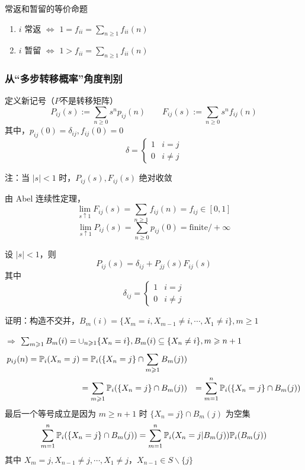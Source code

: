 \begin{proposition}
    常返和暂留的等价命题
    \begin{enumerate}
        \item $i$ 常返 $\Leftrightarrow$ $1=f_{ii}=\sum_{n\geq 1}f_{ii}(n)$
        \item $i$ 暂留 $\Leftrightarrow$ $1>f_{ii}=\sum_{n\geq 1}f_{ii}(n)$
    \end{enumerate}
\end{proposition}

\subsubsection{从“多步转移概率”角度判别}

定义新记号（$P$不是转移矩阵）
\[
P_{ij}(s):=\sum_{n\geq 0}s^n p_{ij}(n)\qquad F_{ij}(s):=\sum_{n\geq 0}s^n f_{ij}(n)
\]
其中，$p_{ij}(0)=\delta_{ij},f_{ij}(0)=0$
\[
\delta=\begin{cases}
    1 & i=j\\
    0 & i\neq j
\end{cases}
\]

注：当 $|s|<1$ 时，$P_{ij}(s),F_{ij}(s)$ 绝对收敛

由 Abel 连续性定理，
\[
\lim_{s\uparrow 1}F_{ij}(s)=\sum_{n\geq 1}f_{ij}(n)=f_{ij}\in [0,1]
\]
\[
\lim_{s\uparrow 1}P_{ij}(s)=\sum_{n\geq 0}p_{ij}(0)=\text{finite}/+\infty
\]
\begin{lemma}
     设 $|s|<1$，则
    \[
    P_{ij}(s)=\delta_{ij}+P_{jj}(s)F_{ij}(s)
    \]
    其中
    \[
    \delta_{ij}=\begin{cases}
        1 & i=j\\
        0 & i\neq j
    \end{cases}
    \]
\end{lemma}

证明：构造不交并，$B_m(i)=\{X_m=i,X_{m-1}\neq i,\cdots,X_1\neq i\}, m\geq 1$

$\Rightarrow$ $\sum_{m\geqslant 1}B_m(i)=\cup_{n\geqslant 1}\{X_n=i\}, B_m(i)\subseteq \{X_n\neq i\}, m\geqslant n+1$
\[
\begin{aligned}
    p_{ij}(n)=\mathbb{P}_i(X_n=j)&=\mathbb{P}_i(\{X_n=j\}\cap \sum_{m\geqslant 1}B_m(j))\\
    &=\sum_{m\geqslant 1}\mathbb{P}_i(\{X_n=j\}\cap B_m(j))
    &=\sum_{m=1}^n\mathbb{P}_i(\{X_n=j\}\cap B_m(j))
\end{aligned}
\]
最后一个等号成立是因为 $m\geq n+1$ 时 $\{X_n=j\}\cap B_m(j)$ 为空集
\[
\sum_{m=1}^n\mathbb{P}_i(\{X_n=j\}\cap B_m(j))=\sum_{m=1}^n\mathbb{P}_i(X_n=j|B_m(j))\mathbb{P}_i(B_m(j))
\]
其中 $X_m=j,X_{n-1}\neq j,\cdots,X_1\neq j$，$X_{n-1}\in S\backslash \{j\}$

